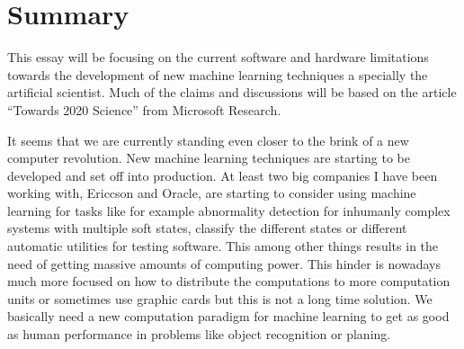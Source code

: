 \documentclass{article}
\begin{document}

%
% 


\section{Summary}
    This essay will be focusing on the current software and hardware limitations
    towards the development of new machine learning techniques a specially the
    artificial scientist. Much of the claims and discussions will be based on
    the article ``Towards 2020 Science'' from Microsoft Research.\cite{ms2020}

    It seems that we are currently standing even closer to the brink of a new 
    computer revolution. New machine learning techniques are starting to be 
    developed and set off into production. At least two big companies I have been working
    with, Ericcson and Oracle, are starting to consider using machine learning
    for tasks like for example abnormality detection for inhumanly complex
    systems with multiple soft
    states, classify the different states or different automatic utilities for
    testing software. This among other things results in
    the need of getting massive amounts of computing power.
    This hinder is nowadays much more focused on how to 
    distribute the computations to more computation units or sometimes use
    graphic cards but this is not a long time solution. We basically need a new
    computation paradigm for machine learning to get as good as human
    performance in problems like object recognition or planing.
\end{document}
